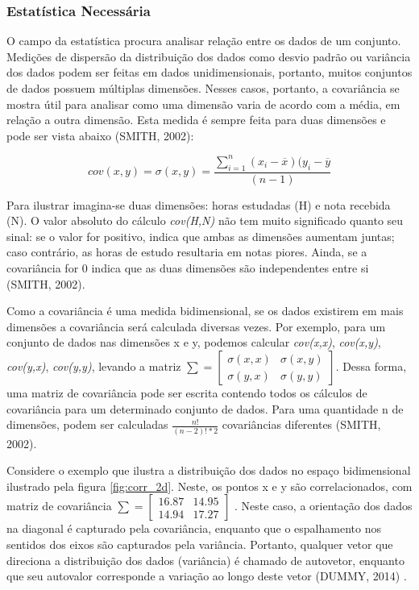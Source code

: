 \documentclass[12pt]{report}
\begin{document}
\subsubsection{Estatística Necessária}

O campo da estatística procura analisar relação entre os dados de um conjunto. Medições de dispersão da distribuição dos dados como desvio padrão ou variância dos dados podem ser feitas em dados unidimensionais, portanto, muitos conjuntos de dados possuem múltiplas dimensões. Nesses casos, portanto, a covariância se mostra útil para analisar como uma dimensão varia de acordo com a média, em relação a outra dimensão. Esta medida é sempre feita para duas dimensões e pode ser vista abaixo (SMITH, 2002):

\begin{equation}
    cov(x, y) = \sigma(x,y) = \frac{\sum_{i=1}^{n}(x_i - \overline{x})(y_i - \overline{y}}{(n - 1)}
\end{equation}

Para ilustrar imagina-se duas dimensões: horas estudadas (H) e nota recebida (N). O valor absoluto do cálculo \textit{cov(H,N)} não tem muito significado quanto seu sinal: se o valor for positivo, indica que ambas as dimensões aumentam juntas; caso contrário, as horas de estudo resultaria em notas piores. Ainda, se a covariância for 0 indica que as duas dimensões são independentes entre si (SMITH, 2002).

Como a covariância é uma medida bidimensional, se os dados existirem em mais dimensões a covariância será calculada diversas vezes. Por exemplo, para um conjunto de dados nas dimensões x e y, podemos calcular \textit{cov(x,x)}, \textit{cov(x,y)}, \textit{cov(y,x)}, \textit{cov(y,y)}, levando a matriz $ \sum = \begin{bmatrix}
    \sigma(x,x) & \sigma(x,y)\\
    \sigma(y,x) & \sigma(y,y)
    \end{bmatrix}
$. Dessa forma, uma matriz de covariância pode ser escrita contendo todos os cálculos de covariância para um determinado conjunto de dados. Para uma quantidade n de dimensões, podem ser calculadas $\frac{n!}{(n-2)!*2}$ covariâncias diferentes (SMITH, 2002).

Considere o exemplo que ilustra a distribuição dos dados no espaço bidimensional ilustrado pela figura \ref{fig:corr_2d}. Neste, os pontos x e y são correlacionados, com matriz de covariância  $ \sum = \begin{bmatrix}
    16.87 & 14.95\\
    14.94 & 17.27
    \end{bmatrix}
    $
. Neste caso, a orientação dos dados na diagonal é capturado pela covariância, enquanto que o espalhamento nos sentidos dos eixos são capturados pela variância. Portanto, qualquer vetor que direciona a distribuição dos dados (variância) é chamado de autovetor, enquanto que seu autovalor corresponde a variação ao longo deste vetor (DUMMY, 2014) . 
\end{document}
